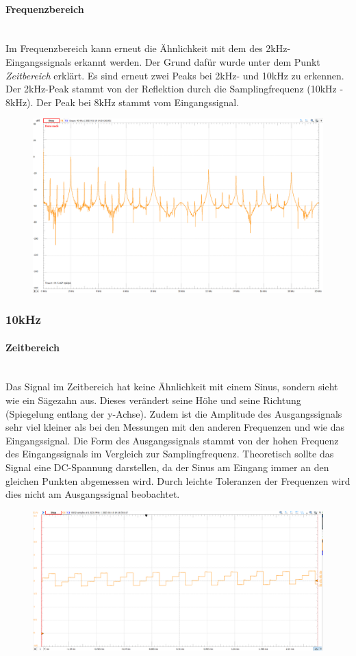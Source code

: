 \documentclass{article}
\begin{document}
\paragraph{Frequenzbereich}\mbox{}\\
Im Frequenzbereich kann erneut die Ähnlichkeit mit dem des 2kHz-Eingangssignals erkannt werden. Der Grund dafür wurde unter dem Punkt \textit{Zeitbereich} erklärt. Es sind erneut zwei Peaks bei 2kHz- und 10kHz zu erkennen. Der 2kHz-Peak stammt von der Reflektion durch die Samplingfrequenz (10kHz - 8kHz). Der Peak bei 8kHz stammt vom Eingangssignal.
\begin{figure}[h]
    \centering
    \includegraphics[width=0.8\linewidth]{img/Freq_06.png}
\end{figure}

\subsubsection{10kHz}
\paragraph{Zeitbereich}\mbox{}\\
Das Signal im Zeitbereich hat keine Ähnlichkeit mit einem Sinus, sondern sieht wie ein Sägezahn aus. Dieses verändert seine Höhe und seine Richtung (Spiegelung entlang der y-Achse). Zudem ist die Amplitude des Ausgangssignals sehr viel kleiner als bei den Messungen mit den anderen Frequenzen und wie das Eingangssignal. Die Form des Ausgangssignals stammt von der hohen Frequenz des Eingangssignals im Vergleich zur Samplingfrequenz. Theoretisch sollte das Signal eine DC-Spannung darstellen, da der Sinus am Eingang immer an den gleichen Punkten abgemessen wird. Durch leichte Toleranzen der Frequenzen wird dies nicht am Ausgangssignal beobachtet.
\begin{figure}[h]
    \centering
    \includegraphics[width=0.75\linewidth]{img/Signal_07.png}
\end{figure}
\end{document}
